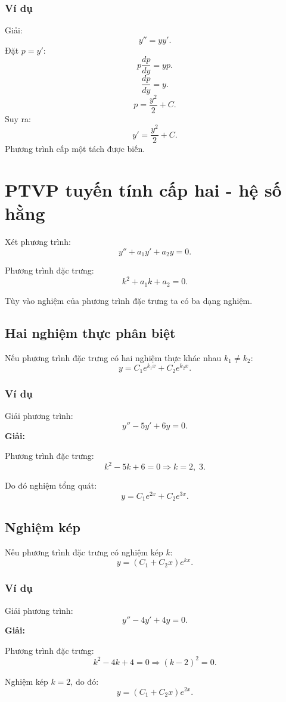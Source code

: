 \documentclass[12pt,a4paper]{article}
\begin{document}
\subsubsection*{Ví dụ}
Giải:
\[
y'' = yy'.
\]
Đặt $p=y'$:
\[
p\frac{dp}{dy} = yp.
\]
\[
\frac{dp}{dy}=y.
\]
\[
p = \frac{y^2}{2} + C.
\]
Suy ra:
\[
y' = \frac{y^2}{2} + C.
\]
Phương trình cấp một tách được biến.

\section{PTVP tuyến tính cấp hai - hệ số hằng}

Xét phương trình:
\[
y'' + a_1 y' + a_2 y = 0.
\]

Phương trình đặc trưng:
\[
k^2 + a_1 k + a_2 = 0.
\]

Tùy vào nghiệm của phương trình đặc trưng ta có ba dạng nghiệm.

\subsection{Hai nghiệm thực phân biệt}
Nếu phương trình đặc trưng có hai nghiệm thực khác nhau $k_1 \neq k_2$:
\[
y = C_1 e^{k_1 x} + C_2 e^{k_2 x}.
\]

\subsubsection*{Ví dụ}
Giải phương trình:
\[
y'' - 5y' + 6y = 0.
\]
\textbf{Giải:}

Phương trình đặc trưng:
\[
k^2 - 5k + 6 = 0 \Rightarrow k = 2,\; 3.
\]

Do đó nghiệm tổng quát:
\[
y = C_1 e^{2x} + C_2 e^{3x}.
\]

\bigskip

\subsection{Nghiệm kép}
Nếu phương trình đặc trưng có nghiệm kép $k$:
\[
y = (C_1 + C_2 x)e^{kx}.
\]

\subsubsection*{Ví dụ}
Giải phương trình:
\[
y'' - 4y' + 4y = 0.
\]
\textbf{Giải:}

Phương trình đặc trưng:
\[
k^2 - 4k + 4 = 0 \Rightarrow (k-2)^2 = 0.
\]

Nghiệm kép $k=2$, do đó:
\[
y = (C_1 + C_2 x)e^{2x}.
\]
\end{document}
